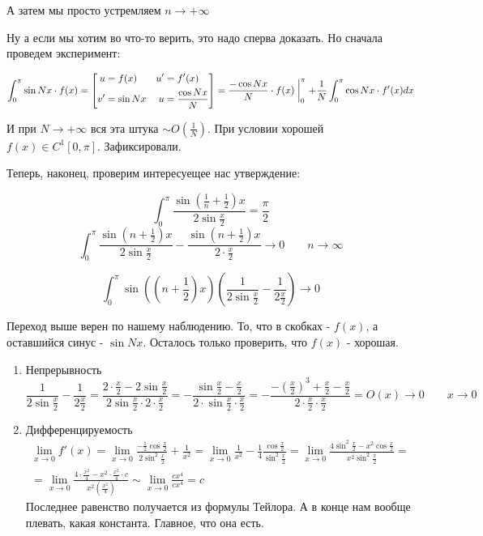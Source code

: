 \documentclass{article}
\begin{document}
А затем мы просто устремляем $n \to +\infty$

Ну а если мы хотим во что-то верить, это надо сперва доказать. Но сначала проведем эксперимент:

$$
\int_0^\pi \sin{Nx} \cdot f(x) =
\left[
    \begin{alignedat}{2}
        u &= f(x)\quad & u' &= f'(x) \\ 
        v' &= \sin{Nx}\quad & u &= \frac{\cos{Nx}} {N}
    \end{alignedat}
\right]
= \frac{-\cos{Nx}}{N} \cdot f(x) \biggm|_0^\pi + \frac{1}{N}\int_0^\pi \cos{Nx} \cdot f'(x) dx
$$

И при $N \to +\infty$ вся эта штука $\sim O\left(\frac{1}{N}\right)$. При условии хорошей $f(x) \in C^1[0, \pi]$.
Зафиксировали.

Теперь, наконец, проверим интересуещее нас утверждение:

$$
\int_0^\pi \frac{\sin{\left(\frac{1}{n} + \frac{1}{2}\right)x}}{2\sin{\frac{x}{2}}} = \frac{\pi}{2}
$$
$$
\int_0^\pi \frac{\sin{\left(n + \frac{1}{2}\right)x}}{2\sin{\frac{x}{2}}} - \frac{\sin{\left(n + \frac{1}{2}\right)x}}{2\cdot \frac{x}{2}} \to 0 \qquad n\to \infty
$$

$$
\int_0^\pi \sin{\left(\left(n + \frac{1} {2}\right)x\right)} \left(\frac{1}{2\sin{\frac{x}{2}}} - \frac{1}{2 \frac{x}{2}}\right) \to 0
$$

Переход выше верен по нашему наблюдению. То, что в скобках - $f(x)$, а оставшийся синус - $\sin{Nx}$. Осталось только проверить, что $f(x)$ - хорошая.

\begin{enumerate}
    \item Непрерывность
        $$
        \frac{1}{2\sin{\frac{x}{2}}} - \frac{1}{2\frac{x}{2}} = \frac{2 \cdot \frac{x}{2} - 2\sin{\frac{x}{2}}}{2\sin{\frac{x}{2}} \cdot 2 \cdot \frac{x}{2}} = - \frac{\sin{\frac{x}{2}} - \frac{x}{2}} {2 \cdot \sin{\frac{x}{2}} \cdot \frac{x}{2}} = - \frac{- \left(\frac{x}{2}\right)^3 + \frac{x}{2} - \frac{x}{2}} {2 \cdot \frac{x}{2} \cdot \frac{x}{2}} = O(x) \to 0 \qquad x \to 0
        $$
    \item Дифференцируемость
        \begin{multline*}
            \lim_{x\to 0} f'(x) = \lim_{x\to 0} \frac{- \frac{1}{2} \cos{\frac{x}{2}}} {2\sin^2\frac{x}{2}} + \frac{1}{x^2} = \lim_{x\to 0} \frac{1}{x^2} - \frac{1}{4} \frac{\cos{\frac{x}{2}}} {\sin^2{\frac{x}{2}}} = \lim_{x\to 0} \frac{4\sin^2{\frac{x}{2}} - x^2 \cos{\frac{x}{2}}}{x^2 \sin^2{\frac{x}{2}}} = \\ = \lim_{x\to 0} \frac{4 \cdot \frac{x^2}{4} - x^2 \cdot \frac{x^2}{4} \cdot c}{x^2\left(\frac{x^2} {4}\right)} \sim \lim_{x\to 0} \frac{c x^4}{c x^4}  = c
        \end{multline*}
        Последнее равенство получается из формулы Тейлора. А в конце нам вообще плевать, какая константа. Главное, что она есть.
\end{enumerate}
\end{document}

